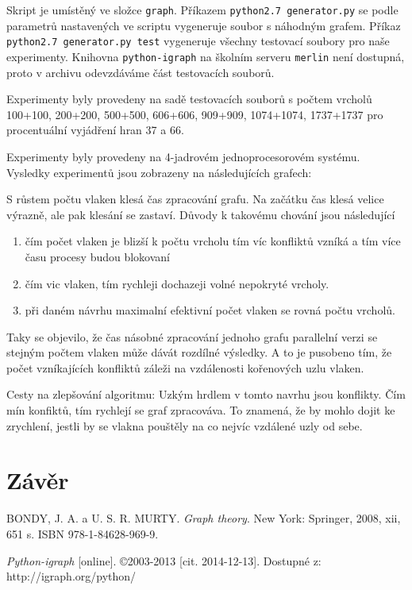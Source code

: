 \documentclass[a4paper, 11pt, titlepage, final]{article}[3. prosinec 2011]
\begin{document}
Skript je umístěný ve složce \texttt{graph}. Příkazem \texttt{python2.7 generator.py} se podle parametrů nastavených ve scriptu vygeneruje soubor s náhodným grafem. Příkaz \texttt{python2.7 generator.py test} vygeneruje všechny testovací soubory pro naše experimenty. Knihovna \texttt{python-igraph} na školním serveru \texttt{merlin} není dostupná, proto v archivu odevzdáváme část testovacích souborů.

Experimenty byly provedeny na sadě testovacích souborů s počtem vrcholů 100+100, 200+200, 500+500, 606+606, 909+909, 1074+1074, 1737+1737 pro procentuální vyjádření hran 37 a 66.

Experimenty byly provedeny na 4-jadrovém jednoprocesorovém systému.
Vysledky experimentů jsou zobrazeny na následujících grafech:

S růstem počtu vlaken klesá čas zpracování grafu. Na začátku čas klesá velice výrazně, ale pak klesání se zastaví. Důvody k takovému chování jsou následující
\begin{enumerate}
\item čím počet vlaken je blizší k počtu vrcholu tím víc konfliktů vzníká a tím více času procesy budou blokovaní
\item čím vic vlaken, tím rychleji dochazeji volné nepokryté vrcholy.
\item při daném návrhu maximalní efektivní počet vlaken se rovná počtu vrcholů.
\end{enumerate}

Taky se objevilo, že čas násobné zpracování jednoho grafu parallelní verzi se stejným počtem vlaken může dávát rozdílné výsledky. A to je pusobeno tím, že počet vzníkajících konfliktů záleži na vzdálenosti kořenových uzlu vlaken.

Cesty na zlepšování algoritmu:
    Uzkým hrdlem v tomto navrhu jsou konflikty. Čím mín konfiktů, tím rychlejí se graf zpracováva. To znamená, že by mohlo dojit ke zrychlení, jestli by se vlakna pouštěly na co nejvíc vzdálené uzly od sebe.

\section{Závěr}

\begin{thebibliography}{1}
  
   BONDY, J. A. a U. S. R. MURTY. \emph{Graph theory}. New York: Springer, 2008, xii, 651 s. ISBN 978-1-84628-969-9. 
  
   \emph{Python-igraph} [online]. \copyright 2003-2013 [cit. 2014-12-13]. Dostupné z: http://igraph.org/python/ 

\end{thebibliography}


\end{document}
